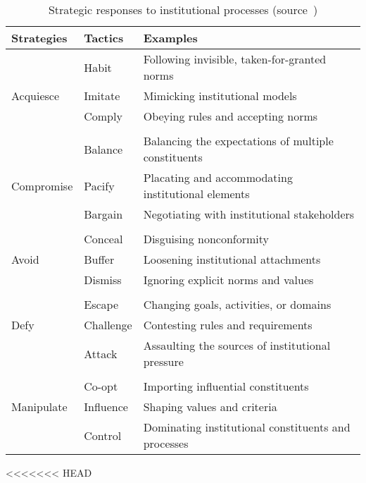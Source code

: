 \begin{table}[htdp]
  \caption[Strategic responses to institutional processes]{Strategic responses to institutional processes (source~\cite{Oliver:1991tm})}\label{tab:Oliver:1991}
\centering
\begin{tabular}{lll} 
  \toprule
	Strategies & Tactics & Examples \\ 
	\midrule
	          &Habit        &Following invisible, taken-for-granted norms\\
Acquiesce     &Imitate      &Mimicking institutional models\\
	          &Comply       &Obeying rules and accepting norms\\
	\\
	          &Balance       &Balancing the expectations of multiple constituents\\
Compromise    &Pacify        &Placating and accommodating institutional elements\\
	          &Bargain       &Negotiating with institutional stakeholders\\
	\\
	          &Conceal       &Disguising nonconformity\\
Avoid         &Buffer        &Loosening institutional attachments\\
              &Dismiss       &Ignoring explicit norms and values\\
    \\
              &Escape        &Changing goals, activities, or domains\\
Defy          &Challenge     &Contesting rules and requirements\\
              &Attack        &Assaulting the sources of institutional pressure\\
   \\  
              &Co-opt        &Importing influential constituents\\
Manipulate    & Influence    &Shaping values and criteria\\
              &Control       &Dominating institutional constituents and processes\\
	\bottomrule
\end{tabular}
\end{table}
<<<<<<< HEAD

